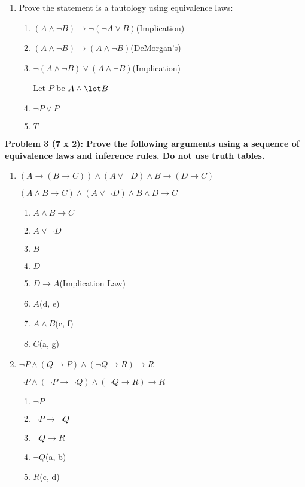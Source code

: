 \documentclass[12pt,twoside]{article}
\begin{document}
\begin{enumerate}
\begin{enumerate}
\begin{tabular}{|c|c|c|c|c|c|c|}
	\end{tabular}
    \item Prove the statement is a tautology using equivalence laws:

	\begin{enumerate}
		\item $(A \land \lnot B) \to \lnot(\lnot A \lor B)$\hfill(Implication)
		\item $(A \land \lnot B) \to (A \land \lnot B)$\hfill(DeMorgan's)
		\item $\lnot(A \land \lnot B) \lor (A \land \lnot B)$\hfill(Implication)

		Let $P$ be $A \land \lot B$

		\item $\lnot P \lor P$
		\item $T$
	\end{enumerate}
\end{enumerate}
\end{enumerate}

\newpage


\textbf{Problem 3 (7 x 2): Prove the following arguments using a sequence of equivalence
laws and inference rules. Do not use truth tables.}
\begin{enumerate}
    \item $(A \rightarrow (B \rightarrow C)) \land (A \lor \neg D) \land B \rightarrow (D \rightarrow C)$

	\equiv $(A \land B \rightarrow C) \land (A \lor \neg D) \land B \land D \rightarrow C$

	\begin{enumerate}
		\item $A \land B \to C$
		\item $A \lor \lnot D$
		\item $B$
		\item $D$
		\item $D \to A$\hfill(Implication Law)
		\item $A$\hfill(d, e)
		\item $A \land B$\hfill(c, f)
		\item $C$\hfill(a, g)
	\end{enumerate}
    \clearpage
    \item $\neg P \land (Q \rightarrow P ) \land (\neg Q \rightarrow R) \rightarrow R$

	\equiv $\lnot P \land (\lnot P \to \lnot Q) \land (\lnot Q \to R) \to R$

	\begin{enumerate}
		\item $\lnot P$
		\item $\lnot P \to \lnot Q$
		\item $\lnot Q \to R$
		\item $\lnot Q$\hfill(a, b)
		\item $R$\hfill(c, d)
	\end{enumerate}
\end{enumerate}
\newpage
\end{document}
